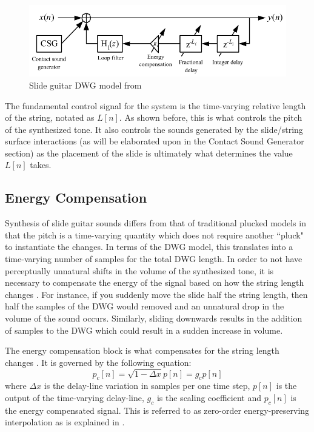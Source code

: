 \documentclass[main.tex]{subfiles}
\begin{document}
\begin{figure}[h]
    \centering
    \includegraphics[scale=.75]{./images/pictures/SDL_slide_model.PNG}
    \caption{Slide guitar DWG model from }
    \label{fig:original_DWG}
\end{figure}

The fundamental control signal for the system is the time-varying relative length of the string, notated as $L[n]$. As shown before, this is what controls the pitch of the synthesized tone. It also controls the sounds generated by the slide/string surface interactions (as will be elaborated upon in the Contact Sound Generator section) as the placement of the slide is ultimately what determines the value $L[n]$ takes.

\subsection{Energy Compensation}
Synthesis of slide guitar sounds differs from that of traditional plucked models in that the pitch is a time-varying quantity which does not require another ``pluck" to instantiate the changes. In terms of the DWG model, this translates into a time-varying number of samples for the total DWG length. In order to not have perceptually unnatural shifts in the volume of the synthesized tone, it is necessary to compensate the energy of the signal based on how the string length changes . For instance, if you suddenly move the slide half the string length, then half the samples of the DWG would removed and an unnatural drop in the volume of the sound occurs. Similarly, sliding downwards results in the addition of samples to the DWG which could result in a sudden increase in volume. 

The energy compensation block is what compensates for the string length changes . It is governed by the following equation:
\begin{equation}
    p_c[n] = \sqrt{1-\Delta x}p[n] = g_c p[n]
\end{equation}
where $\Delta x$ is the delay-line variation in samples per one time step, $p[n]$ is the output of the time-varying delay-line, $g_c$ is the scaling coefficient and $p_c[n]$ is the energy compensated signal. This is referred to as zero-order energy-preserving interpolation as is explained in .
\end{document}
